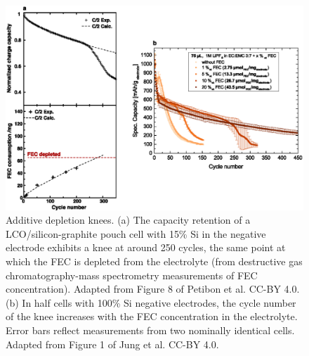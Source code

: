 \documentclass[journal=jpclcd,manuscript=article]{achemso}
\begin{document}
\begin{figure}[ht]
\centering
\includegraphics[scale = 0.9]{figures/fec_depletion.eps}
\caption{Additive depletion knees.
(a) The capacity retention of a LCO/silicon-graphite pouch cell with 15\% Si in the negative electrode exhibits a knee at around 250 cycles, the same point at which the FEC is depleted from the electrolyte (from destructive gas chromatography-mass spectrometry measurements of FEC concentration). Adapted from Figure 8 of Petibon et al.\cite{petibon_studies_2016} CC-BY 4.0.
(b) In half cells with 100\% Si negative electrodes, the cycle number of the knee increases with the FEC concentration in the electrolyte.
Error bars reflect measurements from two nominally identical cells.
Adapted from Figure 1 of Jung et al.\cite{jung_consumption_2016} CC-BY 4.0.}  
\label{fig:fec_knee}
\end{figure}
\end{document}
